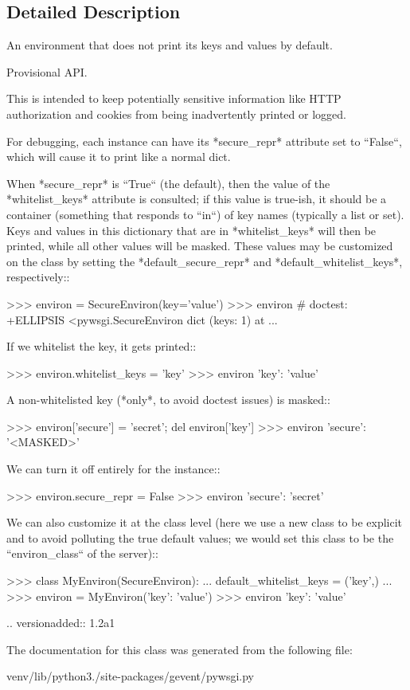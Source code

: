 \subsection{Detailed Description}
\begin{DoxyVerb}An environment that does not print its keys and values
by default.

Provisional API.

This is intended to keep potentially sensitive information like
HTTP authorization and cookies from being inadvertently printed
or logged.

For debugging, each instance can have its *secure_repr* attribute
set to ``False``, which will cause it to print like a normal dict.

When *secure_repr* is ``True`` (the default), then the value of
the *whitelist_keys* attribute is consulted; if this value is
true-ish, it should be a container (something that responds to
``in``) of key names (typically a list or set). Keys and values in
this dictionary that are in *whitelist_keys* will then be printed,
while all other values will be masked. These values may be
customized on the class by setting the *default_secure_repr* and
*default_whitelist_keys*, respectively::

    >>> environ = SecureEnviron(key='value')
    >>> environ # doctest: +ELLIPSIS
    <pywsgi.SecureEnviron dict (keys: 1) at ...

If we whitelist the key, it gets printed::

    >>> environ.whitelist_keys = {'key'}
    >>> environ
    {'key': 'value'}

A non-whitelisted key (*only*, to avoid doctest issues) is masked::

    >>> environ['secure'] = 'secret'; del environ['key']
    >>> environ
    {'secure': '<MASKED>'}

We can turn it off entirely for the instance::

    >>> environ.secure_repr = False
    >>> environ
    {'secure': 'secret'}

We can also customize it at the class level (here we use a new
class to be explicit and to avoid polluting the true default
values; we would set this class to be the ``environ_class`` of the
server)::

    >>> class MyEnviron(SecureEnviron):
    ...    default_whitelist_keys = ('key',)
    ...
    >>> environ = MyEnviron({'key': 'value'})
    >>> environ
    {'key': 'value'}

.. versionadded:: 1.2a1
\end{DoxyVerb}
 

The documentation for this class was generated from the following file\+:\begin{DoxyCompactItemize}
\item 
venv/lib/python3./site-\/packages/gevent/pywsgi.\+py\end{DoxyCompactItemize}
